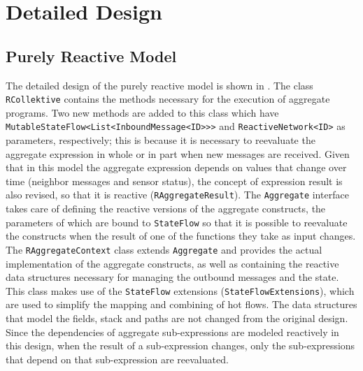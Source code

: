 \section{Detailed Design}

\subsection{Purely Reactive Model}
\label{subsection:purely-reactive-model}

The detailed design of the purely reactive model is shown in . The class \texttt{RCollektive} contains the methods necessary for the execution of aggregate programs. Two new methods are added to this class which have \texttt{MutableStateFlow<List<InboundMessage<ID>>>} and \texttt{ReactiveNetwork<ID>} as parameters, respectively; this is because it is necessary to reevaluate the aggregate expression in whole or in part when new messages are received. Given that in this model the aggregate expression depends on values that change over time (neighbor messages and sensor status), the concept of expression result is also revised, so that it is reactive (\texttt{RAggregateResult}). The \texttt{Aggregate} interface takes care of defining the reactive versions of the aggregate constructs, the parameters of which are bound to \texttt{StateFlow} so that it is possible to reevaluate the constructs when the result of one of the functions they take as input changes. The \texttt{RAggregateContext} class extends \texttt{Aggregate} and provides the actual implementation of the aggregate constructs, as well as containing the reactive data structures necessary for managing the outbound messages and the state. This class makes use of the \texttt{StateFlow} extensions (\texttt{StateFlowExtensions}), which are used to simplify the mapping and combining of hot flows. The data structures that model the fields, stack and paths are not changed from the original design. Since the dependencies of aggregate sub-expressions are modeled reactively in this design, when the result of a sub-expression changes, only the sub-expressions that depend on that sub-expression are reevaluated.

